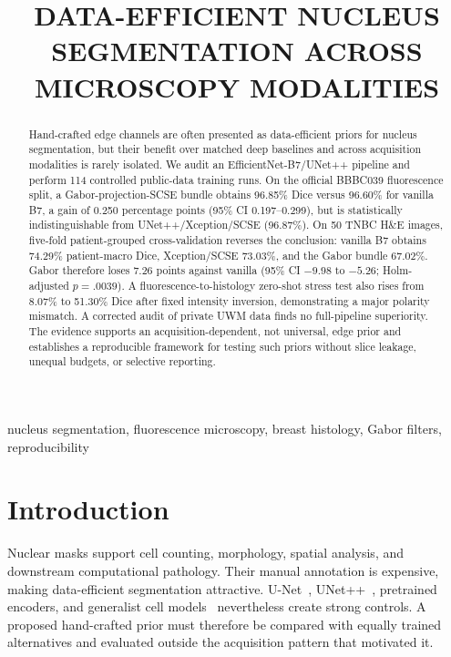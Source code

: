 \documentclass{article}
\title{DATA-EFFICIENT NUCLEUS SEGMENTATION ACROSS MICROSCOPY MODALITIES}
\begin{document}
\maketitle

\begin{abstract}
Hand-crafted edge channels are often presented as data-efficient priors for nucleus segmentation, but their benefit over matched deep baselines and across acquisition modalities is rarely isolated. We audit an EfficientNet-B7/UNet++ pipeline and perform 114 controlled public-data training runs. On the official BBBC039 fluorescence split, a Gabor-projection-SCSE bundle obtains 96.85\% Dice versus 96.60\% for vanilla B7, a gain of 0.250 percentage points (95\% CI 0.197--0.299), but is statistically indistinguishable from UNet++/Xception/SCSE (96.87\%). On 50 TNBC H\&E images, five-fold patient-grouped cross-validation reverses the conclusion: vanilla B7 obtains 74.29\% patient-macro Dice, Xception/SCSE 73.03\%, and the Gabor bundle 67.02\%. Gabor therefore loses 7.26 points against vanilla (95\% CI $-9.98$ to $-5.26$; Holm-adjusted $p=.0039$). A fluorescence-to-histology zero-shot stress test also rises from 8.07\% to 51.30\% Dice after fixed intensity inversion, demonstrating a major polarity mismatch. A corrected audit of private UWM data finds no full-pipeline superiority. The evidence supports an acquisition-dependent, not universal, edge prior and establishes a reproducible framework for testing such priors without slice leakage, unequal budgets, or selective reporting.
\end{abstract}

\begin{keywords}
nucleus segmentation, fluorescence microscopy, breast histology, Gabor filters, reproducibility
\end{keywords}

\section{Introduction}
Nuclear masks support cell counting, morphology, spatial analysis, and downstream computational pathology. Their manual annotation is expensive, making data-efficient segmentation attractive. U-Net~\cite{ronneberger2015unet}, UNet++~\cite{zhou2018unetpp}, pretrained encoders, and generalist cell models~\cite{pachitariu2025cellposesam,archit2025microsam} nevertheless create strong controls. A proposed hand-crafted prior must therefore be compared with equally trained alternatives and evaluated outside the acquisition pattern that motivated it.
\end{document}
